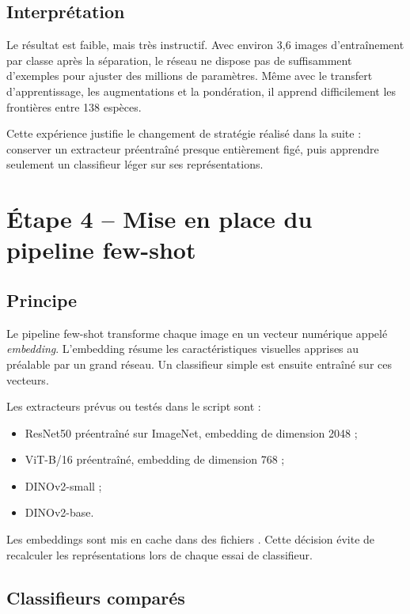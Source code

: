 \documentclass[12pt,a4paper]{report}
\newcommand{\fichier}[1]{\texttt{\detokenize{#1}}}
\begin{document}
\section{Interprétation}

Le résultat est faible, mais très instructif. Avec environ 3,6 images d'entraînement par classe après la séparation, le réseau ne dispose pas de suffisamment d'exemples pour ajuster des millions de paramètres. Même avec le transfert d'apprentissage, les augmentations et la pondération, il apprend difficilement les frontières entre 138 espèces.

Cette expérience justifie le changement de stratégie réalisé dans la suite : conserver un extracteur préentraîné presque entièrement figé, puis apprendre seulement un classifieur léger sur ses représentations.

\chapter{Étape 4 -- Mise en place du pipeline few-shot}

\section{Principe}

Le pipeline few-shot transforme chaque image en un vecteur numérique appelé \emph{embedding}. L'embedding résume les caractéristiques visuelles apprises au préalable par un grand réseau. Un classifieur simple est ensuite entraîné sur ces vecteurs.

Les extracteurs prévus ou testés dans le script sont :
\begin{itemize}
  \item ResNet50 préentraîné sur ImageNet, embedding de dimension 2048 ;
  \item ViT-B/16 préentraîné, embedding de dimension 768 ;
  \item DINOv2-small ;
  \item DINOv2-base.
\end{itemize}

Les embeddings sont mis en cache dans des fichiers \fichier{.npz}. Cette décision évite de recalculer les représentations lors de chaque essai de classifieur.

\section{Classifieurs comparés}
\end{document}
